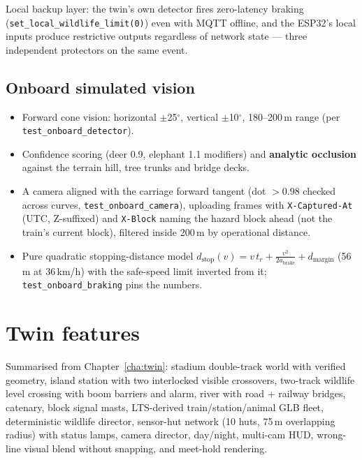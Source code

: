 Local backup layer: the twin's own detector fires zero-latency braking
(\texttt{set\_local\_wildlife\_limit(0)}) even with MQTT offline, and the
ESP32's local inputs produce restrictive outputs regardless of network
state --- three independent protectors on the same event.

\subsection{Onboard simulated vision}

\begin{itemize}
  \item Forward cone vision: horizontal $\pm$25$^\circ$, vertical
        $\pm$10$^\circ$, 180--200\,m range (per
        \texttt{test\_onboard\_detector}).
  \item Confidence scoring (deer 0.9, elephant 1.1 modifiers) and
        \textbf{analytic occlusion} against the terrain hill, tree trunks
        and bridge decks.
  \item A camera aligned with the carriage forward tangent
        (dot $> 0.98$ checked across curves,
        \texttt{test\_onboard\_camera}), uploading frames with
        \texttt{X-Captured-At} (UTC, Z-suffixed) and
        \texttt{X-Block} naming the hazard block ahead (not the train's
        current block), filtered inside 200\,m by operational distance.
  \item Pure quadratic stopping-distance model
        $d_{\text{stop}}(v) = v\,t_r + \tfrac{v^2}{2a_{\text{brake}}} + d_{\text{margin}}$
        (56\,m at 36\,km/h) with the safe-speed limit inverted from it;
        \texttt{test\_onboard\_braking} pins the numbers.
\end{itemize}

\section{Twin features}

Summarised from Chapter~\ref{cha:twin}: stadium double-track world with
verified geometry, island station with two interlocked visible crossovers,
two-track wildlife level crossing with boom barriers and alarm, river with
road + railway bridges, catenary, block signal masts, LTS-derived
train/station/animal GLB fleet, deterministic wildlife director,
sensor-hut network (10 huts, 75\,m overlapping radius) with status lamps,
camera director, day/night, multi-cam HUD, wrong-line visual blend
without snapping, and meet-hold rendering.

